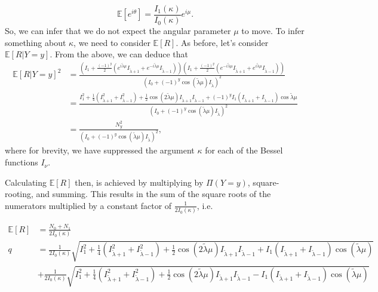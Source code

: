 \documentclass[]{report}
\begin{document}
\[
\mathbb{E}[e^{i \theta}] = \frac{I_{1}(\kappa)}{I_0(\kappa)}e^{i \mu}.
\]
So, we can infer that we do not expect the angular parameter $\mu$ to move. To infer something about $\kappa$, we need to consider $\mathbb{E}[R]$. As before, let's consider $\mathbb{E}[R | Y = y]$. From the above, we can deduce that
 \begin{align*}
	 \mathbb{E}[R | Y = y]^{2} &= \frac{\left( I_1 + \frac{(-1)^{y}}{2}\left( e^{i \tilde{\lambda} \mu}I_{\tilde{\lambda} + 1}+ e^{- i \tilde{\lambda} \mu}I_{\tilde{\lambda} -1} \right)  \right) \left( I_1 + \frac{(-1)^{y}}{2}\left( e^{-i \tilde{\lambda} \mu}I_{\tilde{\lambda} + 1} + e^{i \tilde{\lambda} \mu} I_{\tilde{\lambda} -1 } \right)  \right) }{\left( I_0 + (-1)^{y}\cos(\tilde{\lambda} \mu) I_{\tilde{\lambda}} \right)^{2} } \\
				   &= \frac{I_1^{2} + \frac{1}{4}\left( I_{\tilde{\lambda} + 1}^2 + I_{\tilde{\lambda} - 1}^2 \right) +\frac{1}{2} \cos\left( 2 \tilde{\lambda} \mu \right)  I_{\tilde{\lambda} +1}I_{\tilde{\lambda} - 1} + (-1)^{y} I_1\left( I_{\tilde{\lambda} + 1} + I_{\tilde{\lambda} - 1} \right) \cos \tilde{\lambda} \mu}{\left( I_0 + (-1)^{y}\cos (\tilde{\lambda} \mu) I_{\tilde{\lambda}} \right) ^2} \\
				   &= \frac{N_y^2}{\left( I_0 + (-1)^{y}\cos(\tilde{\lambda} \mu) I_{\tilde{\lambda}} \right) ^2},
\end{align*}
where for brevity, we have suppressed the argument $\kappa$ for each of the Bessel functions $I_{\nu}$.

Calculating $\mathbb{E}[R]$ then, is achieved by multiplying by  $\Pi(Y = y)$, square-rooting, and summing. This results in the sum of the square roots of the numerators multiplied by a constant factor of $\frac{1}{2 I_0(\kappa)}$, i.e.

\begin{align*}
	\mathbb{E}[R] &= \frac{N_0 + N_1}{2 I_0(\kappa)} \\
q		      &= \frac{1}{2 I_0(\kappa) } \sqrt{I_1^2 + \frac{1}{4} \left( I_{\tilde{\lambda} + 1}^{2} + I_{\tilde{\lambda} - 1}^2 \right)  + \frac{1}{2}\cos(2 \tilde{\lambda} \mu) I_{\tilde{\lambda} +1} I_{\tilde{\lambda} - 1} + I_1 \left( I_{\tilde{\lambda} + 1} + I_{\tilde{\lambda} -1 } \right) \cos (\tilde{\lambda} \mu) } \\
		      & + \frac{1}{2 I_0(\kappa) } \sqrt{I_1^2 + \frac{1}{4} \left( I_{\tilde{\lambda} + 1}^{2} + I_{\tilde{\lambda} - 1}^2 \right)  + \frac{1}{2}\cos(2 \tilde{\lambda} \mu) I_{\tilde{\lambda} +1} I_{\tilde{\lambda} - 1} - I_1 \left( I_{\tilde{\lambda} + 1} + I_{\tilde{\lambda} -1 } \right) \cos (\tilde{\lambda} \mu) }
\end{align*}
\end{document}
